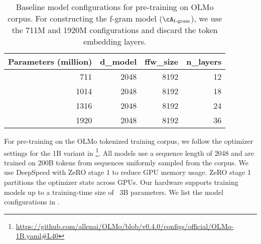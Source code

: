 \begin{table}[h]
    \centering
    \begin{tabular}{r|r r r}
        \toprule
        \textbf{Parameters (million)} & \textbf{d\_model} & \textbf{ffw\_size} & \textbf{n\_layers} \\
        \midrule
         711 &  2048  &  8192  &  12   \\
        1014  &  2048   &  8192  &  18     \\
        1316  &   2048 &  8192   &  24     \\
        1920  &  2048  &  8192  &  36     \\
        \bottomrule
    \end{tabular}
    \caption{Baseline model configurations for pre-training on OLMo corpus. For constructing the f-gram model ($\Afgram$), we use the 711M and 1920M configurations and discard the token embedding layers.}
    \label{tab:olmo_model_configs}
\end{table}


For pre-training on the OLMo tokenized training corpus, we follow the optimizer settings for the 1B variant in \citet{OLMo} \footnote{\url{https://github.com/allenai/OLMo/blob/v0.4.0/configs/official/OLMo-1B.yaml\#L40}}. All models use a sequence length of 2048 and are trained on 200B tokens from sequences uniformly sampled from the corpus. We use DeepSpeed \citep{deepspeed_repo} with ZeRO stage 1 to reduce GPU memory usage. ZeRO stage 1 partitions the optimizer state across GPUs. Our hardware supports training models up to a training-time size of ~3B parameters. We list the model configurations in .